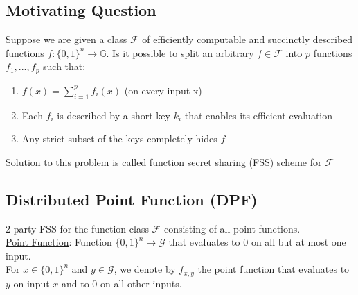 \subsection{Motivating Question}
Suppose we are given a class $\mathcal{F}$ of efficiently computable and succinctly described functions $f: \{0, 1\}^n \rightarrow \mathbb{G}$. Is it possible to split an arbitrary $f \in \mathcal{F}$ into $p$ functions $f_1, ..., f_p$ such that:
\begin{enumerate}
    \item $f(x) = \sum_{i=1}^pf_i(x)$ (on every input x)
    \item Each $f_i$ is described by a short key $k_i$ that enables its efficient evaluation
    \item Any strict subset of the keys completely hides $f$
\end{enumerate}
Solution to this problem is called function secret sharing (FSS) scheme for $\mathcal{F}$

\subsection{Distributed Point Function (DPF)}
2-party FSS for the function class $\mathcal{F}$ consisting of all point functions.\\

\underline{Point Function}: Function $\{0, 1\}^n \rightarrow \mathcal{G}$ that evaluates to 0 on all but at most one input. \\

For $x \in \{0, 1\}^n$ and $y \in \mathcal{G}$, we denote by $f_{x, y}$ the point function that evaluates to $y$ on input $x$ and to $0$ on all other inputs.

